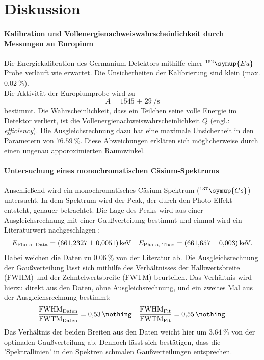 \section{Diskussion}
\paragraph{Kalibration und Vollenergienachweiswahrscheinlichkeit durch Messungen an Europium}
Die Energiekalibration des Germanium-Detektors mithilfe einer $^{152}\symup{Eu}$-Probe verläuft wie erwartet.
Die Unsicherheiten der Kalibrierung sind klein (max. $\SI{0.02}{\%}$).\\
Die Aktivität der Europiumprobe wird zu
\begin{equation*}
	A  = \SI{1545(29)}{\per \second}
\end{equation*}
bestimmt.
Die Wahrscheinlichkeit, dass ein Teilchen seine volle Energie im Detektor verliert, ist die Vollenergienachweiswahrscheinlichkeit $Q$ (engl.: \textit{efficiency}).
Die Ausgleichsrechnung dazu hat eine maximale Unsicherheit in den Parametern von $\SI{76.59}{\%}$.
Diese Abweichungen erklären sich möglicherweise durch einen ungenau apporoximierten Raumwinkel.\\

\paragraph{Untersuchung eines monochromatischen Cäsium-Spektrums}
Anschließend wird ein monochromatisches Cäsium-Spektrum ($^{137}\symup{Cs}$) untersucht.
In dem Spektrum wird der Peak, der durch den Photo-Effekt entsteht, genauer betrachtet.
Die Lage des Peaks wird aus einer Ausgleichsrechnung mit einer Gaußverteilung bestimmt und einmal wird ein Literaturwert nachgeschlagen \cite{nucleide}:
\begin{align*}
E_{\text{Photo, Data}} = \SI{661.2327 (51)}{\kilo \electronvolt} && E_{\text{Photo, Theo}} = \SI{661.657 (3)}{\kilo \electronvolt}.
\end{align*}
Dabei weichen die Daten zu $\SI{0.06}{\%}$ von der Literatur ab.
Die Ausgleichsrechnung der Gaußverteilung lässt sich mithilfe des Verhältnisses der Halbwertsbreite (FWHM) und der Zehntelwertsbreite (FWTM) beurteilen.
Das Verhältnis wird hierzu direkt aus den Daten, ohne Ausgleichsrechnung, und ein zweites Mal aus der Ausgleichsrechnung bestimmt:
\begin{align*}
	\frac{ \text{FWHM}_{\text{Daten}} }{ \text{FWTM}_{\text{Daten}} }  = \SI{0.53}{\nothing} && 	\frac{ \text{FWHM}_{\text{Fit}} }{ \text{FWTM}_{\text{Fit}} } = \SI{0.55}{\nothing}. \\
\end{align*}
Das Verhältnis der beiden Breiten aus den Daten weicht hier um $\SI{3.64}{\%}$ von der optimalen Gaußverteilung ab.
Dennoch lässt sich bestätigen, dass die 'Spektrallinien' in den Spektren schmalen Gaußverteilungen entsprechen.\\

